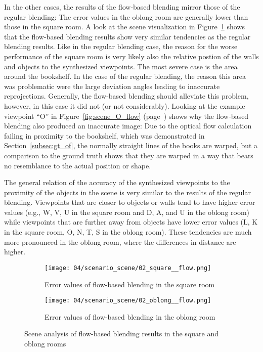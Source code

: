 In the other cases, the results of the flow-based blending mirror those of the regular blending: The error values in the oblong room are generally lower than those in the square room. A look at the scene visualization in Figure~\ref{fig:scene_flow_square_oblong} shows that the flow-based blending results show very similar tendencies as the regular blending results. 
Like in the regular blending case, the reason for the worse performance of the square room is very likely also the relative postion of the walls and objects to the synthesized viewpoints.
The most severe case is the area around the bookshelf. In the case of the regular blending, the reason this area was problematic were the large deviation angles leading to inaccurate reprojections. Generally, the flow-based blending should alleviate this problem, however, in this case it did not (or not considerably). Looking at the example viewpoint ``O'' in Figure~\ref{fig:scene_O_flow} (page~\pageref{fig:scene_O_flow}) shows why the flow-based blending also produced an inaccurate image: 
Due to the optical flow calculation failing in proximity to the bookshelf, which was demonstrated in Section~\ref{subsec:gt_of}, the normally straight lines of the books are warped, but a comparison to the ground truth shows that they are warped in a way that bears no resemblance to the actual position or shape.

The general relation of the accuracy of the synthesized viewpoints to the proximity of the objects in the scene is very similar to the results of the regular blending. Viewpoints that are closer to objects or walls tend to have higher error values (e.g., W, V, U in the square room and D, A, and U in the oblong room) while viewpoints that are further away from objects have lower error values (L, K in the square room, O, N, T, S in the oblong room). These tendencies are much more pronounced in the oblong room, where the differences in distance are higher.

\begin{figure}
\centering
    \hfill
    \begin{subfigure}[b]{0.4\textwidth}
            \centering
            \texttt{[image: 04/scenario\_scene/02\_square\_\_flow.png]}
            \caption{Error values of flow-based blending in the square room}
    \end{subfigure}
    \hfill
    \begin{subfigure}[b]{0.4\textwidth}
            \centering
            \texttt{[image: 04/scenario\_scene/02\_oblong\_\_flow.png]}
            \caption{Error values of flow-based blending in the oblong room}
    \end{subfigure}
    \hfill
  \caption{Scene analysis of flow-based blending results in the square and oblong rooms} \label{fig:scene_flow_square_oblong}
\end{figure}




